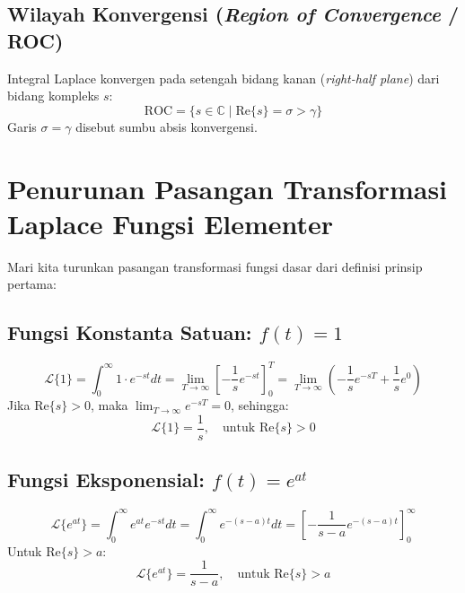 \documentclass[11pt,a4paper]{article}
\theoremstyle{definition}
\begin{document}
\subsection{Wilayah Konvergensi (\textit{Region of Convergence} / ROC)}

Integral Laplace konvergen pada setengah bidang kanan (\textit{right-half plane}) dari bidang kompleks $s$:
\begin{equation}
    \text{ROC} = \{ s \in \mathbb{C} \mid \text{Re}\{s\} = \sigma > \gamma \}
\end{equation}
Garis $\sigma = \gamma$ disebut sumbu absis konvergensi.

\section{Penurunan Pasangan Transformasi Laplace Fungsi Elementer}

Mari kita turunkan pasangan transformasi fungsi dasar dari definisi prinsip pertama:

\subsection{Fungsi Konstanta Satuan: \texorpdfstring{$f(t) = 1$}{f(t) = 1}}
\begin{equation*}
    \mathcal{L}\{1\} = \int_0^\infty 1 \cdot e^{-st} dt = \lim_{T \to \infty} \left[ -\frac{1}{s} e^{-st} \right]_0^T = \lim_{T \to \infty} \left( -\frac{1}{s} e^{-sT} + \frac{1}{s} e^0 \right)
\end{equation*}
Jika $\text{Re}\{s\} > 0$, maka $\lim_{T \to \infty} e^{-sT} = 0$, sehingga:
\begin{equation}
    \mathcal{L}\{1\} = \frac{1}{s}, \quad \text{untuk } \text{Re}\{s\} > 0
    \label{eq:lt_one}
\end{equation}

\subsection{Fungsi Eksponensial: \texorpdfstring{$f(t) = e^{at}$}{f(t) = exp(at)}}
\begin{equation*}
    \mathcal{L}\{e^{at}\} = \int_0^\infty e^{at} e^{-st} dt = \int_0^\infty e^{-(s - a)t} dt = \left[ -\frac{1}{s - a} e^{-(s - a)t} \right]_0^\infty
\end{equation*}
Untuk $\text{Re}\{s\} > a$:
\begin{equation}
    \mathcal{L}\{e^{at}\} = \frac{1}{s - a}, \quad \text{untuk } \text{Re}\{s\} > a
    \label{eq:lt_exp}
\end{equation}
\end{document}
